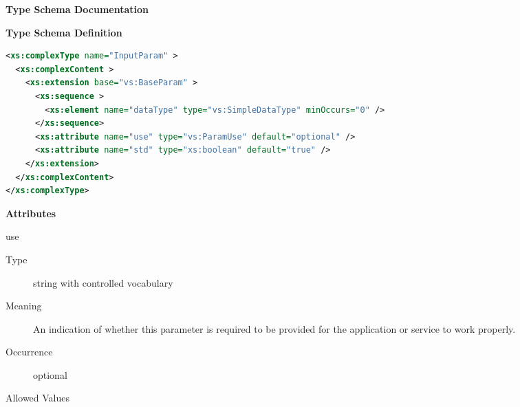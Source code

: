 \documentclass[11pt,a4paper]{ivoa}
\begin{document}
\begin{generated}
\begingroup
      	\renewcommand*\descriptionlabel[1]{%
      	\hbox to 5.5em{\emph{#1}\hfil}}\vspace{2ex}\noindent\textbf{ Type Schema Documentation}



\vspace{1ex}\noindent\textbf{ Type Schema Definition}

\begin{lstlisting}[language=XML,basicstyle=\footnotesize]
<xs:complexType name="InputParam" >
  <xs:complexContent >
    <xs:extension base="vs:BaseParam" >
      <xs:sequence >
        <xs:element name="dataType" type="vs:SimpleDataType" minOccurs="0" />
      </xs:sequence>
      <xs:attribute name="use" type="vs:ParamUse" default="optional" />
      <xs:attribute name="std" type="xs:boolean" default="true" />
    </xs:extension>
  </xs:complexContent>
</xs:complexType>
\end{lstlisting}

\vspace{0.5ex}\noindent\textbf{ Attributes}

\begingroup\small\begin{bigdescription}
\item[use]
\begin{description}
\item[Type] string with controlled vocabulary
\item[Meaning] 
                     An indication of whether this parameter is
                     required to be provided for the application
                     or service to work properly.  
                  
\item[Occurrence] optional

\item[Allowed Values]\hfil
{}
\end{description}
\end{bigdescription}
\end{generated}
\end{document}
